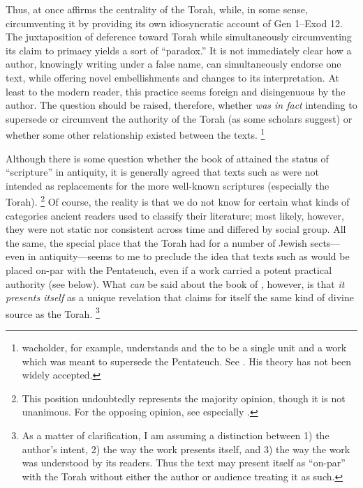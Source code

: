 

\noindent
Thus, \jub at once affirms the centrality of the Torah, while, in some sense, circumventing it by providing its own idiosyncratic account of Gen 1--Exod 12. The juxtaposition of deference toward Torah while simultaneously circumventing its claim to primacy yields a sort of ``\psgraphical paradox.'' It is not immediately clear how a \psgraphical author, knowingly writing under a false name, can simultaneously endorse one text, while offering novel embellishments and changes to its interpretation. At least to the modern reader, this practice seems foreign and disingenuous by the \psgraphical author. The question should be raised, therefore, whether \jub \emph{was in fact} intending to supersede or circumvent the authority of the Torah (as some scholars suggest) or whether some other relationship existed between the texts.%
    \footnote{wacholder, for example, understands \jub and the \templescroll to be a single unit and a work which was meant to supersede the Pentateuch. See \cite{wacholder_kampen-etal1997}. His theory has not been widely accepted.}

Although there is some question whether the book of \jub attained the status of ``scripture'' in antiquity, it is generally agreed that \psgraphical texts such as \jub were not intended as replacements for the more well-known scriptures (especially the Torah).%
    \footnote{This position undoubtedly represents the majority opinion, though it is not unanimous. For the opposing opinion, see especially \cite{wacholder_kampen-etal1997}.}
Of course, the reality is that we do not know for certain what kinds of categories ancient readers used to classify their literature; most likely, however, they were not static nor consistent across time and differed by social group. All the same, the special place that the Torah had for a number of Jewish sects---even in antiquity---seems to me to preclude the idea that \psgraphical texts such as \jub would be placed on-par with the Pentateuch, even if a work carried a potent practical authority (see below). What \emph{can} be said about the book of \jub, however, is that \emph{it presents itself} as a unique revelation that claims for itself the same kind of divine source as the Torah.%
    \footnote{As a matter of clarification, I am assuming a distinction between 1) the author's intent, 2) the way the work presents itself, and 3) the way the work was understood by its readers. Thus the text may present itself as ``on-par'' with the Torah without either the author or audience treating it as such.}

